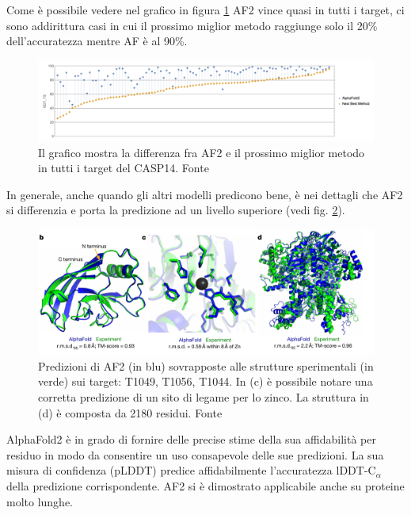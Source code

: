 Come è possibile vedere nel grafico in figura \ref{fig:modelli-casp14} AF2 vince quasi in tutti i target, ci sono addirittura casi in cui il prossimo miglior metodo raggiunge solo il 20\% dell'accuratezza mentre AF è al 90\%.

\begin{figure}[!htb]
	\centering
	\includegraphics[scale=0.4]{images/models1.png}
	\caption{Il grafico mostra la differenza fra AF2 e il prossimo miglior metodo in tutti i target del CASP14. Fonte\cite{moAlq}}
	\label{fig:modelli-casp14}
\end{figure}

In generale, anche quando gli altri modelli predicono bene, è nei dettagli che AF2 si differenzia e porta la predizione ad un livello superiore (vedi fig. \ref{fig:af2-details}).

\begin{figure}[!htb]
	\centering
	\includegraphics[scale=0.5]{images/af2-details.png}
	\caption{Predizioni di AF2 (in blu) sovrapposte alle strutture sperimentali (in verde) sui target: T1049, T1056, T1044. In (c) è possibile notare una corretta predizione di un sito di legame per lo zinco. La struttura in (d) è composta da 2180 residui. Fonte\cite{jumper2021highly}}
	\label{fig:af2-details}
\end{figure}

\par AlphaFold2 è in grado di fornire delle precise stime della sua affidabilità per residuo in modo da consentire un uso consapevole delle sue predizioni. La sua misura di confidenza (pLDDT) predice affidabilmente l'accuratezza lDDT-C$_{\alpha}$ della predizione corrispondente. AF2 si è dimostrato applicabile anche su proteine molto lunghe. 


